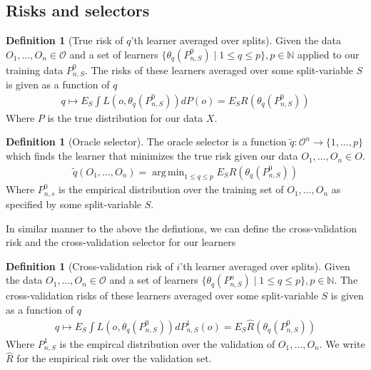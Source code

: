 \documentclass[11pt, a4paper]{article}
\DeclareMathOperator*{\argmin}{arg\,min}
\theoremstyle{definition}
\newtheorem{definition}[theorem]{Definition}
\theoremstyle{remark}
\newcommand{\cl}{q}
\begin{document}
\subsection{Risks and selectors}

\begin{definition}[True risk of $ \cl $'th learner averaged over splits]
    Given the data $ O_1, \ldots, O_n \in \mathcal{O} $ and a set of learners $ \{ \theta_{\cl}(P_{n, S}^{0}) \mid 1 \leq \cl \leq p \}, p \in \mathbb{N} $ applied to our training data $ P_{n, S}^{0} $. The risks of these learners averaged over some split-variable $ S $ is given as a function of $ \cl $ 
    \begin{align*}
        \cl \mapsto E_S \int L(o, \theta_{\cl}(P_{n,S}^{0}) ) dP(o) = E_S R( \theta_\cl(P_{n,S}^{0})) 
    \end{align*}
    Where $ P $ is the true distribution for our data $ X $.
\end{definition}

\begin{definition}[Oracle selector]
    The oracle selector is a function $ \tilde{\cl}: \mathcal{O}^{n} \to \{1,\ldots,p\} $  which finds the learner that minimizes the true risk given our data $ O_1 , \ldots , O_n \in O$. 
    \begin{align*}
        \tilde{\cl}(O_1 , \ldots, O_n) = \argmin_{1 \leq \cl \leq p} E_S R( \theta _\cl (P_{n,S}^0 )) 
    \end{align*}
    Where $ P_{n ,s}^{0} $ is the empirical distribution over the training set of $O_1 , \ldots, O_n $ as specified by some split-variable $ S $. 
\end{definition}
In similar manner to the above the defintions, we can define the cross-validation risk and the cross-validation selector for our learners 

\begin{definition}[Cross-validation risk of $ i $'th learner averaged over splits]
    Given the data $ O_1, \ldots, O_n \in \mathcal{O} $ and a set of learners $ \{ \theta_{\cl}(P_{n, S}^{n}) \mid 1 \leq \cl \leq p \}, p \in \mathbb{N} $. The cross-validation risks of these learners averaged over some split-variable $ S $ is given as a function of $ \cl $ 
    \begin{align*}
        \cl \mapsto E_S \int L(o, \theta_{\cl}(P_{n,S}^{0}) ) dP_{n, S}^{1}(o) = E_S \hat{R}( \theta_\cl(P_{n,S}^{0})) 
    \end{align*}
    Where $ P_{n,S}^{1} $ is the empircal distribution over the validation of $ O_1 , \dots, O_n $. We write $ \hat{R} $ for the empirical risk over the validation set. 
\end{definition}
\end{document}
